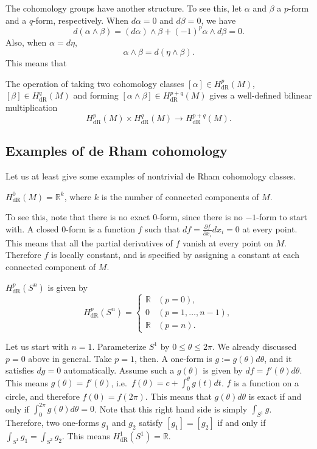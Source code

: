 \documentclass[12pt]{article}
\numberwithin{equation}{section}
\numberwithin{figure}{section}
\theoremstyle{remark}
\def\bR{\mathbb{R}}
\begin{document}
The cohomology groups have another structure.
To see this, let $\alpha$ and $\beta$ a $p$-form and a $q$-form, respectively.
When $d\alpha=0$ and $d\beta=0$, we have \begin{equation}
d(\alpha \wedge \beta)=(d\alpha)\wedge \beta + (-1)^p\alpha \wedge  d\beta =0.
\end{equation}
Also, when $\alpha=d\eta$, \begin{equation}
\alpha\wedge \beta=d(\eta\wedge \beta).
\end{equation}
This means that 
\begin{proposition}
The operation of taking two cohomology classes
$[\alpha] \in H^p_\text{dR}(M)$,
$[\beta] \in H^q_\text{dR}(M)$ 
and forming $[\alpha\wedge \beta] \in H^{p+q}_\text{dR}(M)$ gives a
well-defined bilinear multiplication \begin{equation}
H^p_\text{dR}(M) \times H^q_\text{dR}(M)
\to H^{p+q}_\text{dR}(M).
\end{equation}
\end{proposition}




\subsection{Examples of de Rham cohomology}
Let us at least  give some examples of nontrivial de Rham cohomology classes.

\begin{proposition}
$H^0_\text{dR}(M)=\bR^k$,
where $k$ is the number of connected components of $M$.
\end{proposition}
To see this, note that there is no exact $0$-form, since there is no $-1$-form to start with.
A closed $0$-form is a function $f$ such that $df= \frac{\partial f}{\partial x_i}dx_i=0$ at every point.
This means that all the partial derivatives of $f$ vanish at every point on $M$.
Therefore $f$ is locally constant,
and is specified by assigning a constant at each connected component of $M$.

\begin{example}
$H^p_\text{dR}(S^n)$ is given by \[
H^p_\text{dR}(S^n)= \begin{cases}
\bR & (p=0),\\
0 & (p=1,\ldots, n-1),\\
\bR & (p=n).
\end{cases}
\]
\end{example}

Let us start with $n=1$. Parameterize $S^1$ by $0\le \theta \le 2\pi$.
We already discussed $p=0$ above in general.
Take $p=1$, then. A one-form is $g:=g(\theta)d\theta$, and it satisfies $dg=0$ automatically.
Assume such a $g(\theta)$ is given by $df=f'(\theta) d\theta$.
This means $g(\theta)=f'(\theta)$, i.e.~$f(\theta)=c+ \int_0^\theta g(t)dt$.
$f$ is a function on a circle, and therefore $f(0)=f(2\pi)$.
This means that $g(\theta)d\theta$ is exact if and only if $\int_0^{2\pi} g(\theta)d\theta=0$.
Note that this right hand side is simply $\int_{S^1} g$.
Therefore, two one-forms $g_1$ and $g_2$ satisfy $[g_1]=[g_2]$ if and only if $\int_{S^1} g_1=\int_{S^2}g_2$.
This means $H^1_\text{dR}(S^1)=\bR$.
\end{document}
